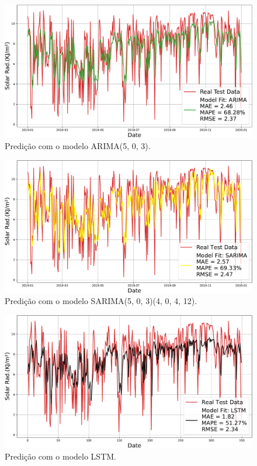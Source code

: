 \documentclass[a4paper]{ifacconf}
\begin{document}
\begin{figure} 
	\centering
	\includegraphics[width=0.9\columnwidth]{images/ARIMA_forecast.pdf}
	\caption{Predição com o modelo \ac{ARIMA}(5, 0, 3).}\label{fig:arima_forecast}
\end{figure}

\begin{figure} 
	\centering
	\includegraphics[width=0.9\columnwidth]{images/SARIMA_forecast.pdf}
	\caption{Predição com o modelo \ac{SARIMA}(5, 0, 3)(4, 0, 4, 12).}\label{fig:sarima_forecast}
\end{figure}

\begin{figure} 
	\centering
	\includegraphics[width=0.9\columnwidth]{images/LSTM_forecast.pdf}
	\caption{Predição com o modelo \ac{LSTM}.}\label{fig:lstm_forecast}
\end{figure}
\end{document}
